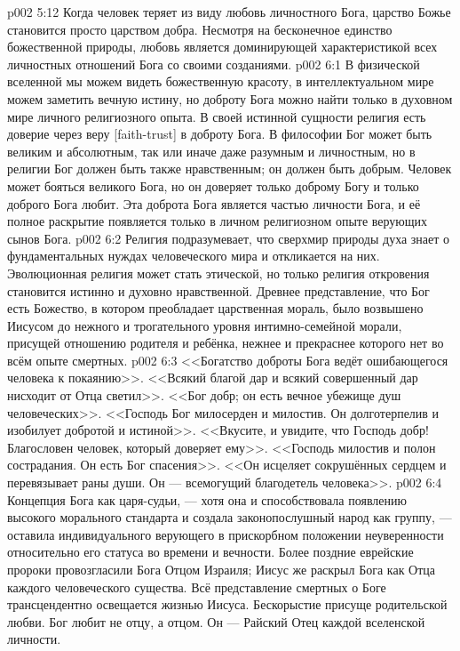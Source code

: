 \vs p002 5:12 \pc Когда человек теряет из виду любовь личностного Бога, царство Божье становится просто царством добра. Несмотря на бесконечное единство божественной природы, любовь является доминирующей характеристикой всех личностных отношений Бога со своими созданиями.
\vs p002 6:1 В физической вселенной мы можем видеть божественную красоту, в интеллектуальном мире можем заметить вечную истину, но доброту Бога можно найти только в духовном мире личного религиозного опыта. В своей истинной сущности религия есть доверие через веру [faith\hyp{}trust] в доброту Бога. В философии Бог может быть великим и абсолютным, так или иначе даже разумным и личностным, но в религии Бог должен быть также нравственным; он должен быть добрым. Человек может бояться великого Бога, но он доверяет только доброму Богу и только доброго Бога любит. Эта доброта Бога является частью личности Бога, и её полное раскрытие появляется только в личном религиозном опыте верующих сынов Бога.
\vs p002 6:2 Религия подразумевает, что сверхмир природы духа знает о фундаментальных нуждах человеческого мира и откликается на них. Эволюционная религия может стать этической, но только религия откровения становится истинно и духовно нравственной. Древнее представление, что Бог есть Божество, в котором преобладает царственная мораль, было возвышено Иисусом до нежного и трогательного уровня интимно\hyp{}семейной морали, присущей отношению родителя и ребёнка, нежнее и прекраснее которого нет во всём опыте смертных.
\vs p002 6:3 \pc <<Богатство доброты Бога ведёт ошибающегося человека к покаянию>>. <<Всякий благой дар и всякий совершенный дар нисходит от Отца светил>>. <<Бог добр; он есть вечное убежище душ человеческих>>. <<Господь Бог милосерден и милостив. Он долготерпелив и изобилует добротой и истиной>>. <<Вкусите, и увидите, что Господь добр! Благословен человек, который доверяет ему>>. <<Господь милостив и полон сострадания. Он есть Бог спасения>>. <<Он исцеляет сокрушённых сердцем и перевязывает раны души. Он --- всемогущий благодетель человека>>.
\vs p002 6:4 \pc Концепция Бога как царя\hyp{}судьи, --- хотя она и способствовала появлению высокого морального стандарта и создала законопослушный народ как группу, --- оставила индивидуального верующего в прискорбном положении неуверенности относительно его статуса во времени и вечности. Более поздние еврейские пророки провозгласили Бога Отцом Израиля; Иисус же раскрыл Бога как Отца каждого человеческого существа. Всё представление смертных о Боге трансцендентно освещается жизнью Иисуса. Бескорыстие присуще родительской любви. Бог любит не  отцу, а  отцом. Он --- Райский Отец каждой вселенской личности.
